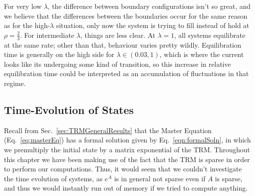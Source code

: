 For very low $\lambda$, the difference between boundary configurations isn't so great, and we believe
that the differences between the boundaries occur for the same reason as for the high-$\lambda$
situation, only now the system is trying to fill instead of hold at $\rho=\frac{2}{3}$. For intermediate
$\lambda$, things are less clear. At $\lambda=1$, all systems equilibrate at the same rate; other than
that, behaviour varies pretty wildly. Equilibration time is generally on the high side for
$\lambda \in (0.03, 1)$, which is where the current looks like its undergoing some kind of
transition, so this increase in relative equilibration time could be interpreted as an accumulation of
fluctuations in that regime.
\subsection{Time-Evolution of States}
Recall from Sec.~\ref{sec:TRMGeneralResults} that the Master Equation (Eq.~\ref{eq:masterEq}) has
a formal solution given by Eq.~\ref{eqn:formalSoln}, in which we premultiply the initial state
by a matrix exponential of the TRM. Throughout this chapter we have been making use of the fact that
the TRM is sparse in order to perform our computations. Thus, it would seem that we couldn't
investigate the time evolution of systems, as $e^A$ is in general not sparse even if $A$ is sparse,
and thus we would instantly run out of memory if we tried to compute anything.

